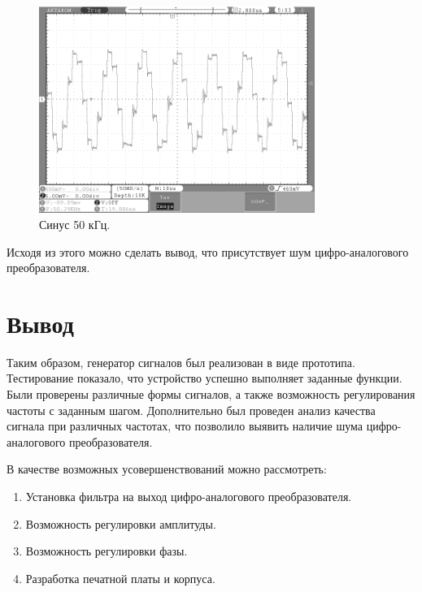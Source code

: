 	\begin{figure}[H]
    \centering
    \includegraphics[width=0.8\textwidth]{../image/sin50.bmp}
    \caption{Синус 50 кГц.}
	\end{figure}	
	
	Исходя из этого можно сделать вывод, что присутствует шум цифро-аналогового преобразователя. 

\section{Вывод}
	Таким образом, генератор сигналов был реализован в виде прототипа. Тестирование показало, что устройство успешно выполняет заданные функции. Были проверены различные формы сигналов, а также возможность регулирования частоты с заданным шагом. Дополнительно был проведен анализ качества сигнала при различных частотах, что позволило выявить наличие шума цифро-аналогового преобразователя. 
	
	В качестве возможных усовершенствований можно рассмотреть:
	\begin{enumerate}
	\item Установка фильтра на выход цифро-аналогового преобразователя.
	\item Возможность регулировки амплитуды.
	\item Возможность регулировки фазы. 
	\item Разработка печатной платы и корпуса.
	\end{enumerate}